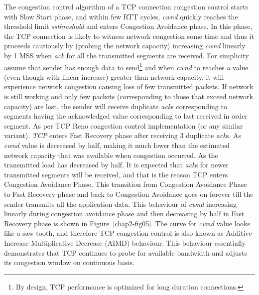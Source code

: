 \begin{multicols}{2}
The congestion control algorithm of a  TCP connection congestion control starts with Slow Start phase, and within few RTT cycles, \textit{cwnd} quickly  reaches the threshold limit \textit{ssthreshold} and enters Congestion Avoidance phase. In this phase, the TCP connection is likely to witness network congestion some time and thus it proceeds cautiously by (probing the network capacity) increasing \textit{cwnd} linearly by 1 MSS when \textit{ack} for all the transmitted segments are received. For simplicity assume that sender has enough data to send\footnote{By design, TCP performance is optimized for long duration connections.} and when \textit{cwnd} to reaches a value (even though with linear increase) greater than network capacity, it will experience network congestion causing loss of few transmitted packets. If network is still working and only few packets (corresponding to those that exceed network capacity) are lost, the sender will receive duplicate \textit{ack}s corresponding to segments having the acknowledged value corresponding to last received in order segment. As per TCP Reno congestion control implementation (or any similar variant), \textit{TCP} enters Fast Recovery phase after receiving 3 duplicate \textit{ack}s.  As \textit{cwnd} value is decreased by half, making it much lower than the estimated network capacity that was available when congestion occurred. As the transmitted load has decreased by half. It is expected that \textit{ack}s for newer transmitted segments will be received, and that is the reason TCP enters Congestion Avoidance Phase.  This transition from Congestion Avoidance Phase to Fast Recovery phase and back to Congestion Avoidance goes on forever till the sender transmits all the application data. This behaviour of \textit{cwnd} increasing linearly during congestion avoidance phase and then decreasing by half in  Fast Recovery phase is shown in Figure~\ref{chap2-fig05}. The curve for \textit{cwnd} value looks like a saw tooth, and therefore TCP congestion control is also known as Additive Increase Multiplicative Decrease (AIMD) behaviour. This behaviour essentially demonstrates that TCP continues to probe for available bandwidth and adjusts its congestion window on continuous basis.
\begin{figure}[H]
\centering

\end{figure}
\end{multicols}
